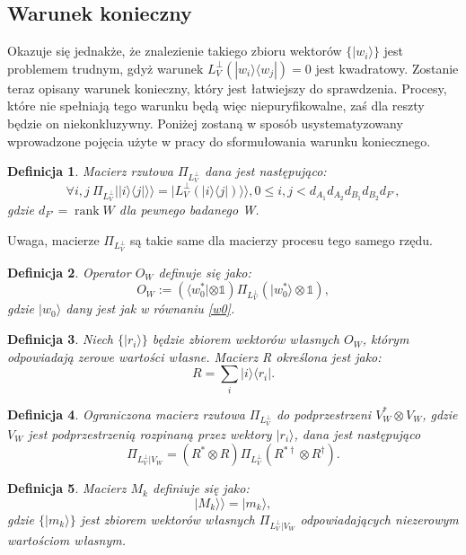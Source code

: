 \documentclass[10pt]{article} %
\newtheorem{definicja}{Definicja}
\DeclareMathOperator{\Rank}{rank}
\newcommand{\Ket}[1]{|#1\rangle}
\newcommand{\Bra}[1]{\langle#1|}
\newcommand{\KKet}[1]{|#1\rangle\rangle}
\newcommand{\I}{\mathbb{1}}
\newcommand{\LPV}{{L^\perp_V}}
\begin{document}
\subsection{Warunek konieczny}
Okazuje się jednakże, że znalezienie takiego zbioru wektorów $\{ \Ket{w_i} \}$ jest problemem trudnym, gdyż warunek $L^\perp_V(\Ket{w_i}\Bra{w_j})=0$ jest kwadratowy. 
Zostanie teraz opisany warunek konieczny, który jest łatwiejszy do sprawdzenia. Procesy, które nie spełniają tego warunku będą więc niepuryfikowalne, zaś dla reszty będzie on niekonkluzywny. Poniżej zostaną w sposób usystematyzowany wprowadzone pojęcia użyte w pracy \cite{purification} do sformułowania 
warunku koniecznego.
\begin{definicja}
Macierz rzutowa $\Pi_\LPV$ dana jest następująco:
\begin{equation}
\forall i,j~\Pi_\LPV \KKet{\Ket{i}\Bra{j}} = \KKet{\LPV(\Ket{i}\Bra{j})}, 0 \leq i,j < d_{A_1} d_{A_2} d_{B_1} d_{B_2} d_{F'},
\end{equation}
gdzie $d_{F'}=\Rank{W}$ dla pewnego badanego W.
\end{definicja}
 Uwaga, macierze $\Pi_\LPV$ są takie same dla macierzy procesu tego samego rzędu.
\begin{definicja}
Operator $O_W$ definuje się jako:
\begin{equation}
O_W:= \left(\Bra{w^*_0} \otimes \I\right) \Pi_\LPV \left( \Ket{w^*_0} \otimes \I\right),
\end{equation}
gdzie $\Ket{w_0}$ dany jest jak w równaniu \eqref{w0}.
\end{definicja}
\begin{definicja}
Niech $\{\Ket{r_i}\}$ będzie zbiorem wektorów własnych $O_W$, którym odpowiadają zerowe wartości własne. Macierz R określona jest jako:
\begin{equation}
R = \sum_i \Ket{i}\Bra{r_i}.
\end{equation}
\end{definicja}
\begin{definicja}
Ograniczona macierz rzutowa $\Pi_\LPV$ do podprzestrzeni $V_W^* \otimes V_W$, gdzie $V_W$ jest podprzestrzenią rozpinaną przez wektory $\Ket{r_i}$, dana jest następująco
\begin{equation}
\Pi_{\LPV|V_W} = (R^* \otimes R) \Pi_\LPV (R^{*\dag} \otimes R^\dag).
\end{equation}
\end{definicja}
\begin{definicja}
Macierz $M_k$ definiuje się jako:
\begin{equation}
\KKet{M_k} = \Ket{m_k},
\end{equation} gdzie $\{ \Ket{m_k} \}$ jest zbiorem wektorów własnych $\Pi_{\LPV|V_W}$ odpowiadających niezerowym wartościom własnym.
\end{definicja}
\end{document}
